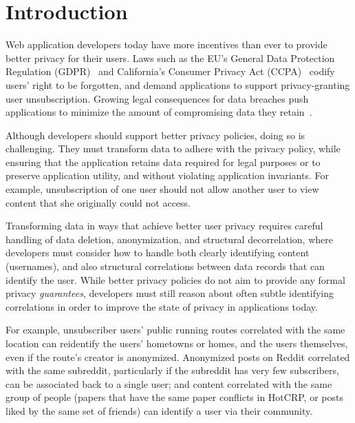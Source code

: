 \section{Introduction}
Web application developers today have more incentives than ever to provide better privacy for their
users.
%
Laws such as the EU's General Data Protection Regulation (GDPR)~\cite{eu:gdpr} and California's
Consumer Privacy Act (CCPA)~\cite{ca:privacy-act} codify users' right to be forgotten, and demand
applications to support privacy-granting user unsubscription.
%
Growing legal consequences for data breaches push applications to minimize the amount of
compromising data they retain~\cite{breach:amazon,breach:twitter, breach:fb, breach:marriott,
breach:quora}.

Although developers should support better privacy policies, doing so is challenging.  They must
transform data to adhere with the privacy policy, while ensuring that the application retains data
required for legal purposes or to preserve application utility, and without violating application
invariants.  
%
For example, unsubscription of one user should not allow another user to view content that she
originally could not access.

Transforming data in ways that achieve better user privacy requires careful handling of data
deletion, anonymization, and structural decorrelation, where developers must consider how to handle
both clearly identifying content (\eg usernames), and also structural correlations between data
records that can identify the user. While better privacy policies do not aim to provide any formal
privacy \emph{guarantees}, developers must still reason about often subtle identifying correlations
in order to improve the state of privacy in applications today. 

For example, unsubscriber users' public running routes correlated with the same location can
reidentify the users' hometowns or homes, and the users themselves, even if the route's creator is
anonymized. Anonymized posts on Reddit correlated with the same subreddit, particularly if the
subreddit has very few subscribers, can be associated back to a single user; and
content correlated with the same group of people (\eg papers that have the same paper conflicts in
HotCRP, or posts liked by the same set of friends) can identify a user via their community.


